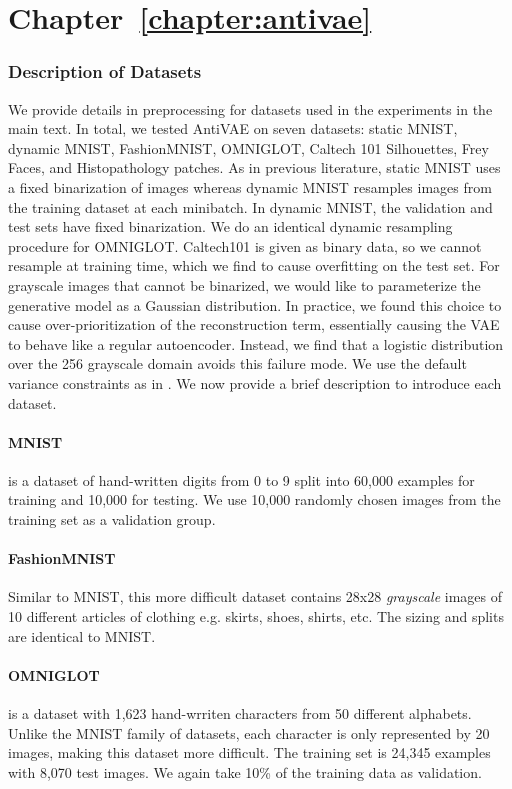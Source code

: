 \section{Chapter~\ref{chapter:antivae}}

\subsubsection{Description of Datasets}

We provide details in preprocessing for datasets used in the experiments in the main text. In total, we tested AntiVAE on seven datasets: static MNIST, dynamic MNIST, FashionMNIST, OMNIGLOT, Caltech 101 Silhouettes, Frey Faces, and Histopathology patches. As in previous literature, static MNIST uses a fixed binarization of images whereas dynamic MNIST resamples images from the training dataset at each minibatch. In dynamic MNIST, the validation and test sets have fixed binarization. We do an identical dynamic resampling procedure for OMNIGLOT. Caltech101 is given as binary data, so we cannot resample at training time, which we find to cause overfitting on the test set. For grayscale images that cannot be binarized, we would like to parameterize the generative model as a Gaussian distribution. In practice, we found this choice to cause over-prioritization of the reconstruction term, essentially causing the VAE to behave like a regular autoencoder. Instead, we find that a logistic distribution over the 256 grayscale domain avoids this failure mode. We use the default variance constraints as in \cite{tomczak2017vae}. We now provide a brief description to introduce each dataset.

\paragraph{MNIST} is a dataset of hand-written digits from 0 to 9 split into 60,000 examples for training and 10,000 for testing. We use 10,000 randomly chosen images from the training set as a validation group.

\paragraph{FashionMNIST} Similar to MNIST, this more difficult dataset contains 28x28 \textit{grayscale} images of 10 different articles of clothing e.g. skirts, shoes, shirts, etc. The sizing and splits are identical to MNIST.

\paragraph{OMNIGLOT} is a dataset with 1,623 hand-wrriten characters from 50 different alphabets. Unlike the MNIST family of datasets, each character is only represented by 20 images, making this dataset more difficult. The training set is 24,345 examples with 8,070 test images. We again take 10\% of the training data as validation.

